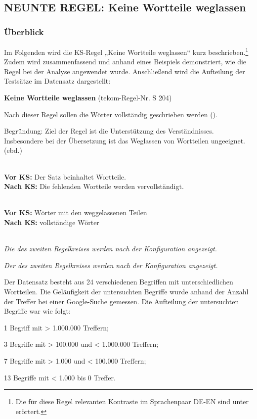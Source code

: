 \subsection{NEUNTE REGEL: Keine Wortteile weglassen}
\label{sec:5.3.9}
 \subsubsection{\label{sec:5.3.9.0}Überblick}

Im Folgenden wird die KS-Regel „Keine Wortteile weglassen“ kurz beschrieben.\footnote{\textrm{Die für diese Regel relevanten Kontraste im Sprachenpaar DE-EN sind unter  erörtert.} } Zudem wird zusammenfassend und anhand eines Beispiels demonstriert, wie die Regel bei der Analyse angewendet wurde. Anschließend wird die Aufteilung der Testsätze im Datensatz dargestellt:

\begin{description}[font=\normalfont\bfseries]
\item [Beschreibung der KS-Regel:] \textbf{Keine Wortteile weglassen} (tekom-Regel-Nr. S 204)

Nach dieser Regel sollen die Wörter vollständig geschrieben werden (\citealt[68]{tekom2013}).

Begründung: Ziel der Regel ist die Unterstützung des Verständnisses. Insbesondere bei der Übersetzung ist das Weglassen von Wortteilen ungeeignet. (ebd.)

\item[Umsetzungsmuster:]
~\\
\textbf{Vor KS:} Der Satz beinhaltet Wortteile.\\
\textbf{Nach KS:} Die fehlenden Wortteile werden vervollständigt.

\item[KS-Stelle]
~\\
\textbf{Vor KS:} Wörter mit den weggelassenen Teilen\\
\textbf{Nach KS:} vollständige Wörter

\item[Beispiele]
~\\
\textit{Die  des zweiten Regelkreises werden nach der Konfiguration angezeigt.}

\textit{Der  des zweiten Regelkreises werden nach der Konfiguration angezeigt.}

\item[Aufteilung der Testsätze:]
Der Datensatz besteht aus 24 verschiedenen Begriffen mit unterschiedlichen Wortteilen. Die Geläufigkeit der untersuchten Begriffe wurde anhand der Anzahl der Treffer bei einer Google-Suche gemessen. Die Aufteilung der untersuchten Begriffe war wie folgt:

1 Begriff mit > 1.000.000 Treffern;

3 Begriffe mit > 100.000 und < 1.000.000 Treffern;

7 Begriffe mit > 1.000 und < 100.000 Treffern;

13 Begriffe mit < 1.000 bis 0 Treffer.

\end{description}

